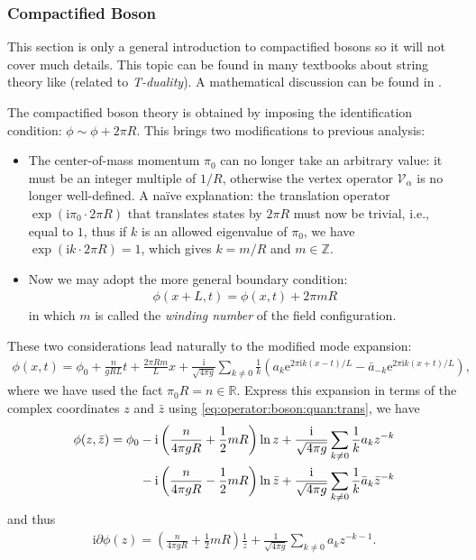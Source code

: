 \documentclass[10pt]{article}
\newcommand{\me}{\mathrm{e}}
\newcommand{\ii}{\mathrm{i}}
\begin{document}
\subsubsection{Compactified Boson}
\begin{notice}
    This section is only a general introduction to compactified bosons so it will not cover much details.
    This topic can be found in many textbooks about string theory like \cite{Polchinski:1998rq,Zwiebach:2004tj}(related to \textit{T-duality}).
    A mathematical discussion can be found in \cite{Ribault:2014hia}. 
\end{notice}
The compactified boson theory is obtained by imposing the identification condition: $\phi\sim\phi+2\pi R$.
This brings two modifications to previous analysis:
\begin{itemize}
    \item The center-of-mass momentum $\pi_0$ can no longer take an arbitrary value: it must be an integer multiple of $1/R$,  otherwise the vertex operator $\mathcal{V}_\alpha$ is no longer well-defined. 
          A na\"ive explanation\cite{Dixon:1989nr}: the translation operator $\exp(\ii \pi_0\cdot2\pi R)$ that translates states by $2\pi R$ must now be trivial, i.e., equal to $1$, thus if $k$ is an allowed eigenvalue of $\pi_0$, we have $\exp(\ii k\cdot2\pi R)=1$, which gives $k=m/R$ and $m\in\mathbb{Z}$.
    \item Now we may adopt the more general boundary condition: 
          \begin{align}
            \phi(x+L,t)=\phi(x,t)+2\pi mR
          \end{align}
          in which $m$ is called the \textit{winding number} of the field configuration.
\end{itemize}
These two considerations lead naturally to the modified mode expansion:
\begin{align}
    \phi(x,t)=\phi_0+\frac{n}{gRL}t+\frac{2\pi Rm}{L}x+\frac{\ii}{\sqrt{4\pi g}}\sum_{k\neq0}\frac{1}{k}\left(a_k\me^{2\pi\ii k(x-t)/L}-\bar{a}_{-k}\me^{2\pi\ii k(x+t)/L}\right),
\end{align}
where we have used the fact $\pi_0 R=n\in\mathbb{R}$.
Express this expansion in terms of the complex coordinates $z$ and $\bar{z}$ using \cref{eq:operator:boson:quan:trans}, we have 
\begin{align}
    \phi(z,\bar{z})=\phi_0&-\ii\left(\frac{n}{4\pi gR}+\frac{1}{2}mR\right)\ln{z}+\frac{\ii}{\sqrt{4\pi g}}\sum_{k\neq0}\frac{1}{k}a_k z^{-k}\notag\\
                          &-\ii\left(\frac{n}{4\pi gR}-\frac{1}{2}mR\right)\ln{\bar{z}}+\frac{\ii}{\sqrt{4\pi g}}\sum_{k\neq0}\frac{1}{k}\bar{a}_k\bar{z}^{-k}
\end{align}
and thus 
\begin{align}
    \ii\partial\phi(z)=\left(\frac{n}{4\pi gR}+\frac{1}{2}mR\right)\frac{1}{z}+\frac{1}{\sqrt{4\pi g}}\sum_{k\neq0}a_k z^{-k-1}.
\end{align}
\end{document}
